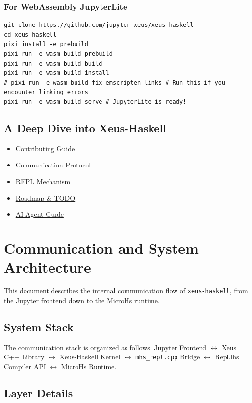 \documentclass[11pt]{scrartcl}
\begin{document}
\subsubsection{For WebAssembly JupyterLite}


\begin{verbatim}
git clone https://github.com/jupyter-xeus/xeus-haskell
cd xeus-haskell
pixi install -e prebuild
pixi run -e wasm-build prebuild
pixi run -e wasm-build build
pixi run -e wasm-build install
# pixi run -e wasm-build fix-emscripten-links # Run this if you encounter linking errors
pixi run -e wasm-build serve # JupyterLite is ready!
\end{verbatim}


\subsection{A Deep Dive into Xeus-Haskell}


\begin{itemize}
\item \hyperref[sec:contributing]{Contributing Guide}
\item \hyperref[sec:communication]{Communication Protocol}
\item \hyperref[sec:repl]{REPL Mechanism}
\item \hyperref[sec:todo]{Roadmap \& TODO}
\item \href{https://github.com/jupyter-xeus/xeus-haskell/blob/main/AGENTS.md}{AI Agent Guide}
\end{itemize}

\section{Communication and System Architecture}
\label{sec:communication}


This document describes the internal communication flow of \texttt{xeus-haskell}, from the Jupyter frontend down to the MicroHs runtime.
\subsection{System Stack}


The communication stack is organized as follows:
Jupyter Frontend \(\leftrightarrow\) Xeus C++ Library \(\leftrightarrow\) Xeus-Haskell Kernel \(\leftrightarrow\) \texttt{mhs\_repl.cpp} Bridge \(\leftrightarrow\) Repl.lhs Compiler API \(\leftrightarrow\) MicroHs Runtime.


\subsection{Layer Details}
\end{document}
